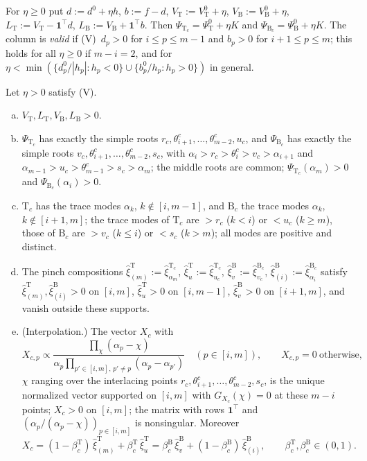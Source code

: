\documentclass[11pt,a4paper]{report}
\newcommand{\one}{\mathbf 1}
\newcommand{\Ts}{\mathrm T}
\newcommand{\Bs}{\mathrm B}
\begin{document}
\begin{definition}\label{def:deformed}
For \(\eta\ge0\) put \(d:=d^0+\eta h\), \(b:=f-d\), \(V_\Ts:=V^0_\Ts+\eta\), \(V_\Bs:=V^0_\Bs+\eta\), \(L_\Ts:=V_\Ts-\one^\top d\),
\(L_\Bs:=V_\Bs+\one^\top b\). Then \(\Psi_{\Ts_c}=\Psi^0_\Ts+\eta K\) and \(\Psi_{\Bs_c}=\Psi^0_\Bs+\eta K\). The column is \emph{valid} if
(V)~\(d_p>0\) for \(i\le p\le m-1\) and \(b_p>0\) for \(i+1\le p\le m\); this holds for all \(\eta\ge0\) if \(m-i=2\), and for
\(\eta<\min(\{d^0_p/|h_p|:h_p<0\}\cup\{b^0_p/h_p:h_p>0\})\) in general.
\end{definition}

\begin{proposition}\label{prop:deformed}
Let \(\eta>0\) satisfy (V).
\begin{enumerate}[(a)]
\item \(V_\Ts,L_\Ts,V_\Bs,L_\Bs>0\).
\item \(\Psi_{\Ts_c}\) has exactly the simple roots \(r_c,\theta^c_{i+1},\dots,\theta^c_{m-2},u_c\), and \(\Psi_{\Bs_c}\) has
exactly the simple roots \(v_c,\theta^c_{i+1},\dots,\theta^c_{m-2},s_c\), with \(\alpha_i>r_c>\theta^c_i>v_c>\alpha_{i+1}\) and
\(\alpha_{m-1}>u_c>\theta^c_{m-1}>s_c>\alpha_m\); the middle roots are common; \(\Psi_{\Ts_c}(\alpha_m)>0\) and \(\Psi_{\Bs_c}(\alpha_i)>0\).
\item \(\Ts_c\) has the trace modes \(\alpha_k\), \(k\notin[i,m-1]\), and \(\Bs_c\) the trace modes \(\alpha_k\), \(k\notin[i+1,m]\); the trace
modes of \(\Ts_c\) are \(>r_c\) (\(k<i\)) or \(<u_c\) (\(k\ge m\)), those of \(\Bs_c\) are \(>v_c\) (\(k\le i\)) or \(<s_c\) (\(k>m\)); all modes
are positive and distinct.
\item The pinch compositions \(\hat\xi^\Ts_{(m)}:=\hat\xi^{\Ts_c}_{\alpha_m}\), \(\hat\xi^\Ts_u:=\hat\xi^{\Ts_c}_{u_c}\),
\(\hat\xi^\Bs_v:=\hat\xi^{\Bs_c}_{v_c}\), \(\hat\xi^\Bs_{(i)}:=\hat\xi^{\Bs_c}_{\alpha_i}\) satisfy \(\hat\xi^\Ts_{(m)},\hat\xi^\Bs_{(i)}>0\) on
\([i,m]\), \(\hat\xi^\Ts_u>0\) on \([i,m-1]\), \(\hat\xi^\Bs_v>0\) on \([i+1,m]\), and vanish outside these supports.
\item (Interpolation.) The vector \(X_c\) with
\[X_{c,p}\propto\frac{\prod_\chi(\alpha_p-\chi)}{\alpha_p\prod_{p'\in[i,m],\,p'\ne p}(\alpha_p-\alpha_{p'})}\quad(p\in[i,m]),\qquad X_{c,p}=0\ \text{otherwise},\]
\(\chi\) ranging over the interlacing points \(r_c,\theta^c_{i+1},\dots,\theta^c_{m-2},s_c\), is the unique
normalized vector supported on \([i,m]\) with \(G_{X_c}(\chi)=0\) at these \(m-i\) points; \(X_c>0\) on \([i,m]\); the matrix with
rows \(\one^\top\) and \((\alpha_p/(\alpha_p-\chi))_{p\in[i,m]}\) is nonsingular. Moreover
\[X_c=(1-\beta^\Ts_c)\,\hat\xi^\Ts_{(m)}+\beta^\Ts_c\,\hat\xi^\Ts_u=\beta^\Bs_c\,\hat\xi^\Bs_v+(1-\beta^\Bs_c)\,\hat\xi^\Bs_{(i)},\qquad
\beta^\Ts_c,\beta^\Bs_c\in(0,1).\]
\end{enumerate}
\end{proposition}
\end{document}
